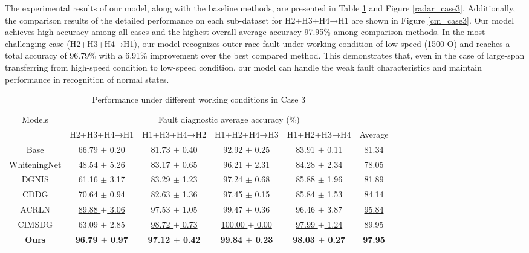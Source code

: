 \documentclass{article}
\begin{document}
	The experimental results of our model, along with the baseline methods, are presented in Table \ref{case3_table} and Figure \ref{radar_case3}. Additionally, the comparison results of the detailed performance on each sub-dataset for H2+H3+H4→H1 are shown in Figure \ref{cm_case3}. Our model achieves high accuracy among all cases and the highest overall average accuracy 97.95\% among comparison methods. In the most challenging case (H2+H3+H4→H1), our model recognizes outer race fault under working condition of low speed (1500-O) and reaches a total accuracy of 96.79\% with a 6.91\% improvement over the best compared method. This demonstrates that, even in the case of large-span transferring from high-speed condition to low-speed condition, our model can handle the weak fault characteristics and maintain performance in recognition of normal states.
	\begin{table}[h!]
		\vspace{-1em}
		\centering
		\smaller
		\caption{Performance under different working conditions in Case 3}\label{case3_table}
		\begin{tabular}{cccccc}
			\toprule
			\multirow{2}{*}{Models} & \multicolumn{5}{c}{Fault diagnostic average accuracy (\%)} \\
			\cmidrule[\heavyrulewidth]{2-6}
			& {H2+H3+H4→H1} & {H1+H3+H4→H2} & {H1+H2+H4→H3} & {H1+H2+H3→H4} & Average \\
			\midrule
			Base & 66.79 $\pm$ 0.20 & 81.73 $\pm$ 0.40 & 92.92 $\pm$ 0.25 &  83.91 $\pm$ 0.11 & 81.34 \\
			WhiteningNet & 48.54 $\pm$ 5.26 & 83.17 $\pm$ 0.65 & 96.21 $\pm$ 2.31 & 84.28 $\pm$ 2.34 & 78.05 \\
			DGNIS & 61.16 $\pm$ 3.17 & 83.29 $\pm$ 1.23 & 97.24 $\pm$ 0.68 &  85.88 $\pm$ 1.96 & 81.89 \\
			CDDG & 70.64 $\pm$ 0.94 & 82.63 $\pm$ 1.36 & 97.45 $\pm$ 0.15 &  85.84 $\pm$ 1.53 & 84.14 \\
			ACRLN & \underline{89.88 $\pm$ 3.06} & 97.53 $\pm$ 1.05 & 99.47 $\pm$ 0.36 & 96.46 $\pm$ 3.87 & \underline{95.84} \\
			CIMSDG & 63.09 $\pm$ 2.85 & \underline{98.72 $\pm$ 0.73} & \underline{100.00 $\pm$ 0.00} & \underline{97.99 $\pm$ 1.24} & 89.95 \\
			\midrule
			\textbf{Ours} & \textbf{96.79 $\pm$ 0.97} & \textbf{97.12 $\pm$ 0.42} & \textbf{99.84 $\pm$ 0.23} & \textbf{98.03 $\pm$ 0.27} & \textbf{ 97.95 } \\
			\bottomrule
		\end{tabular}
		\vspace{-.5em}
	\end{table}
\end{document}
